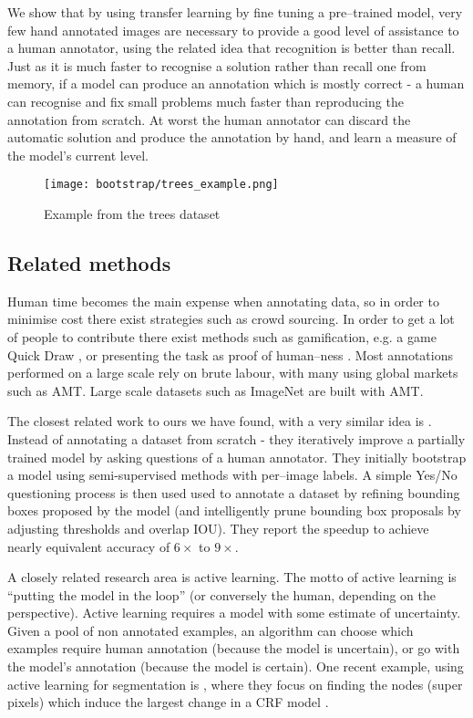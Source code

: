 We show that by using transfer learning by fine tuning a pre--trained model, very few hand annotated images are necessary to provide a good level of assistance to a human annotator, using the related idea that recognition is better than recall. Just as it is much faster to recognise a solution rather than recall one from memory, if a model can produce an annotation which is mostly correct - a human can recognise and fix small problems much faster than reproducing the annotation from scratch. At worst the human annotator can discard the automatic solution and produce the annotation by hand, and learn a measure of the model's current level.

\begin{figure}[h]
\centering
\texttt{[image: bootstrap/trees\_example.png]}

\caption{Example from the trees dataset}
\label{fig:tree}
\end{figure}

\subsection{Related methods}


Human time becomes the main expense when annotating data, so in order to minimise cost there exist strategies such as crowd sourcing. In order to get a lot of people to contribute there exist methods such as gamification, e.g. a game Quick Draw \cite{Ha2017}, or presenting the task as proof of human--ness \cite{Goodfellow2013a}.  Most annotations performed on a large scale rely on brute labour, with many using global markets such as \gls{AMT}. Large scale datasets such as ImageNet \cite{Russakovsky2015} are built with \gls{AMT}. 

The closest related work to ours we have found, with a very similar idea is \cite{Papadopoulos2016}. Instead of annotating a dataset from scratch - they iteratively improve a partially trained model by asking questions of a human annotator. They initially bootstrap a model using semi-supervised methods with per--image labels. A simple Yes/No questioning process is then used used to annotate a dataset by refining bounding boxes proposed by the model (and intelligently prune bounding box proposals by adjusting thresholds and overlap \gls{IOU}). They report the speedup to achieve nearly equivalent accuracy of $6\times$ to $9\times$.

A closely related research area is active learning. The motto of active learning is ``putting the model in the loop'' (or conversely the human, depending on the perspective). Active learning requires a model with some estimate of uncertainty. Given a pool of non annotated examples, an algorithm can choose which examples require human annotation (because the model is uncertain), or go with the model's annotation (because the model is certain). One recent example, using active learning for segmentation is \cite{Xu2017}, where they focus on finding the nodes (super pixels) which induce the largest change in a \gls{CRF} model .


